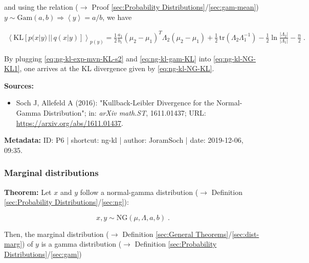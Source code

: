 \documentclass[a4paper,12pt,twoside]{book}
\begin{document}
and using the relation ($\rightarrow$ Proof \ref{sec:Probability Distributions}/\ref{sec:gam-mean}) $y \sim \mathrm{Gam}(a,b) \Rightarrow \left\langle y \right\rangle = a/b$, we have

\begin{equation} \label{eq:ng-kl-exp-mvn-KL-s2}
\begin{split}
\left\langle \mathrm{KL}[p(x|y)\,||\,q(x|y)] \right\rangle_{p(y)} = \frac{1}{2} \frac{a_1}{b_1} (\mu_2 - \mu_1)^T \Lambda_2 (\mu_2 - \mu_1) + \frac{1}{2} \, \mathrm{tr}(\Lambda_2 \Lambda_1^{-1}) - \frac{1}{2} \ln \frac{|\Lambda_2|}{|\Lambda_1|} - \frac{n}{2} \; .
\end{split}
\end{equation}

By plugging \eqref{eq:ng-kl-exp-mvn-KL-s2} and \eqref{eq:ng-kl-gam-KL} into \eqref{eq:ng-kl-NG-KL1}, one arrives at the KL divergence given by \eqref{eq:ng-kl-NG-KL}.


\vspace{1em}
\textbf{Sources:}
\begin{itemize}
\item Soch J, Allefeld A (2016): "Kullback-Leibler Divergence for the Normal-Gamma Distribution"; in: \textit{arXiv math.ST}, 1611.01437; URL: \url{https://arxiv.org/abs/1611.01437}.
\end{itemize}


\vspace{1em}
\textbf{Metadata:} ID: P6 | shortcut: ng-kl | author: JoramSoch | date: 2019-12-06, 09:35.
\vspace{1em}



\subsubsection[\textbf{Marginal distributions}]{Marginal distributions} \label{sec:ng-marg}
\setcounter{equation}{0}

\textbf{Theorem:} Let $x$ and $y$ follow a normal-gamma distribution ($\rightarrow$ Definition \ref{sec:Probability Distributions}/\ref{sec:ng}):

\begin{equation} \label{eq:ng-marg-ng}
x,y \sim \mathrm{NG}(\mu, \Lambda, a, b) \; .
\end{equation}

Then, the marginal distribution ($\rightarrow$ Definition \ref{sec:General Theorems}/\ref{sec:dist-marg}) of $y$ is a gamma distribution ($\rightarrow$ Definition \ref{sec:Probability Distributions}/\ref{sec:gam})
\end{document}
